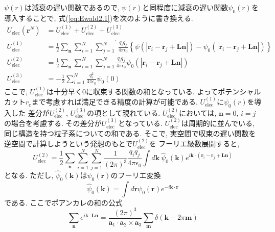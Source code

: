$\psi (r)$は減衰の遅い関数であるので,
$\psi (r)$と同程度に減衰の遅い関数$\psi_{0}(r)$を導入することで,
式(\ref{eq:Ewald2.1})を次のように書き換える.
\begin{align}
    U_{\mathrm{elec}} (\bm{r}^{N})
 &= U_{\mathrm{elec}}^{(1)} + U_{\mathrm{elec}}^{(2)} + U_{\mathrm{elec}}^{(3)}
 \label{eq:Ewald3.1}
 \\
    U_{\mathrm{elec}}^{(1)}
 &=
    \frac{1}{2} \sum_{\bm{n}} \sum_{i=1}^{N} \left.\sum_{j=1}^{N}\right.^{\prime}
    \frac{q_{i} q_{j}}{4 \pi \epsilon_{0}}
    \left\{
            \psi( |\bm{r}_{i} - \bm{r}_{j} + \bm{Ln}| )
           -
            \psi_{0}( |\bm{r}_{i} - \bm{r}_{j} + \bm{Ln}| )
    \right\}
 \label{eq:Ewald3.2}
 \\
    U_{\mathrm{elec}}^{(2)}
 &=
    \frac{1}{2} \sum_{\bm{n}} \sum_{i=1}^{N} \sum_{j=1}^{N}
    \frac{q_{i} q_{j}}{4 \pi \epsilon_{0}}
    \psi_{0}( |\bm{r}_{i} - \bm{r}_{j} + \bm{Ln}| )
 \label{eq:Ewald3.3}
 \\
    U_{\mathrm{elec}}^{(3)}
 &=
    -\frac{1}{2} \sum_{i=1}^{N} \frac{q_{i}^2}{4 \pi \epsilon_{0}} \psi_{0}(0)
 \label{eq:Ewald3.4}
\end{align}
ここで, $U_{\mathrm{elec}}^{(1)}$は十分早く0に収束する関数の和となっている.
よってポテンシャルカット$r_{\mathrm{c}}$まで考慮すれば満足できる精度の計算が可能である.
$U_{\mathrm{elec}}^{(1)}$に$\psi_{0}(r)$を導入した
差分が$U_{\mathrm{elec}}^{(2)}$, $U_{\mathrm{elec}}^{(3)}$の項として現れている.
$U_{\mathrm{elec}}^{(2)}$においては, $\bm{n}=0$, $i=j$の場合を考慮する.
その差分が$U_{\mathrm{elec}}^{(3)}$となっている.
$U_{\mathrm{elec}}^{(2)}$は周期的に並んでいる, 同じ構造を持つ粒子系についての和である.
そこで, 実空間で収束の遅い関数を逆空間で計算しようという発想のもとで$U_{\mathrm{elec}}^{(2)}$を
フーリエ級数展開すると,
\begin{equation}
    U_{\mathrm{elec}}^{(2)}
  =
    \frac{1}{2}
    \sum_{\bm{n}} \sum_{i=1}^{N} \sum_{j=1}^{N}
    \frac{1}{(2 \pi)^{3}}
    \frac{q_{i}q_{j}}{4 \pi \epsilon_{0}}
    \int d \bm{k} ~ \hat{\psi}_{0}(\bm{k})
    e^{i \bm{k} \cdot (\bm{r}_{i} - \bm{r}_{j} + \bm{Ln})}
 \label{eq:Ewald4}
\end{equation}
となる. ただし, $\hat{\psi}_{0}(\bm{k})$は$\psi_{0}(\bm{r})$のフーリエ変換
\begin{equation}
    \hat{\psi}_{0}(\bm{k})
  = \int d \bm{r} \psi_{0}(\bm{r}) e^{-i \bm{k} \cdot \bm{r}}
 \label{eq:Ewald5}
\end{equation}
である. ここでポアンカレの和の公式
\begin{equation}
    \sum_{\bm{n}} e^{i \bm{k} \cdot \bm{Ln}}
  =
    \frac{(2\pi)^{3}}{\bm{a}_{1} \cdot \bm{a}_{2} \times \bm{a}_{3}}
    \sum_{\bm{m}} \delta(\bm{k} - 2\pi \bm{m})
 \label{eq:Ewald6}
\end{equation}
